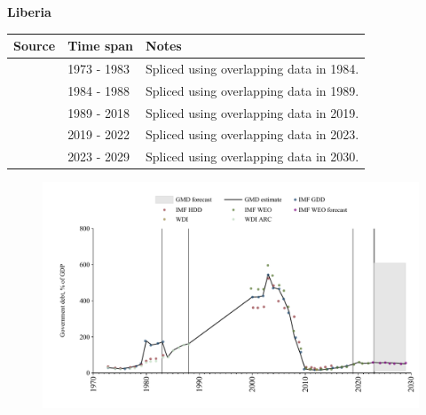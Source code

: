 \documentclass[12pt,a4paper,landscape]{article}
\begin{document}
\begin{adjustbox}{max totalsize={\paperwidth}{\paperheight},center}
\begin{minipage}[t][\textheight][t]{\textwidth}
\vspace*{0.5cm}
{}
\begin{center}
{\Large\bfseries Liberia}
\end{center}
\vspace{0.5cm}
\begin{table}[H]
\centering
\small
\begin{tabular}{|l|l|l|}
\hline
\textbf{Source} & \textbf{Time span} & \textbf{Notes} \\
\hline
\rowcolor{white}\cite{IMF_GDD}& 1973 - 1983 &Spliced using overlapping data in 1984.\\
\rowcolor{lightgray}\cite{WDI_ARC}& 1984 - 1988 &Spliced using overlapping data in 1989.\\
\rowcolor{white}\cite{IMF_GDD}& 1989 - 2018 &Spliced using overlapping data in 2019.\\
\rowcolor{lightgray}\cite{IMF_WEO}& 2019 - 2022 &Spliced using overlapping data in 2023.\\
\rowcolor{white}\cite{IMF_WEO_forecast}& 2023 - 2029 &Spliced using overlapping data in 2030.\\
\hline
\end{tabular}
\end{table}
\begin{figure}[H]
\centering
\includegraphics[width=\textwidth,height=0.6\textheight,keepaspectratio]{graphs/LBR_govdebt_GDP.pdf}
\end{figure}
\end{minipage}
\end{adjustbox}
\end{document}
